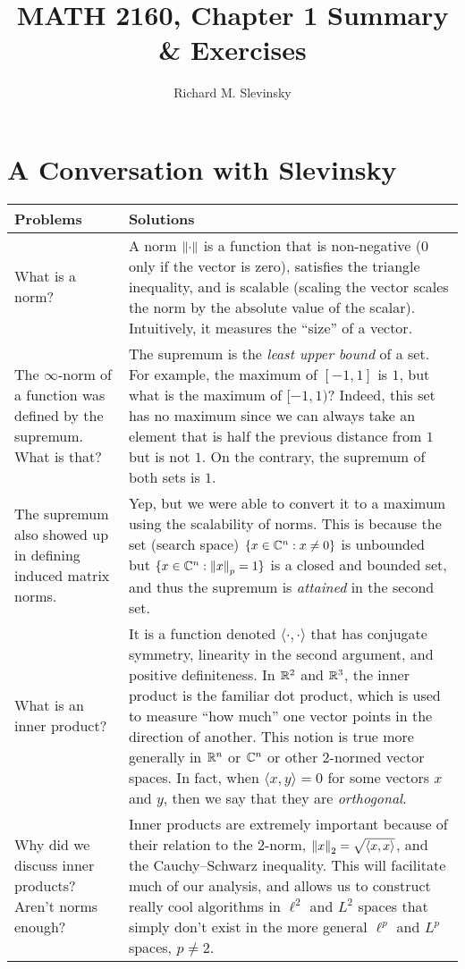 \documentclass[11pt,letterpaper]{article}
\begin{document}
\title{MATH 2160, Chapter 1 Summary \& Exercises}
\author{Richard M. Slevinsky}
\date{}
\maketitle

\section*{A Conversation with Slevinsky}

\begin{longtable}{p{}|p{}}
\hline
Problems & Solutions\\
\hline
What is a norm? & A norm $\left\|{\cdot}\right\|$ is a function that is non-negative ($0$ only if the vector is zero), satisfies the triangle inequality, and is scalable (scaling the vector scales the norm by the absolute value of the scalar). Intuitively, it measures the ``size'' of a vector.\\
The $\infty$-norm of a function was defined by the supremum. What is that? & The supremum is the {\em least upper bound} of a set. For example, the maximum of $[-1,1]$ is $1$, but what is the maximum of $[-1,1)$? Indeed, this set has no maximum since we can always take an element that is half the previous distance from $1$ but is not $1$. On the contrary, the supremum of both sets is $1$.\\
The supremum also showed up in defining induced matrix norms. & Yep, but we were able to convert it to a maximum using the scalability of norms. This is because the set (search space) $\{x\in\mathbb{C}^n : x \ne0\}$ is unbounded but $\{x\in\mathbb{C}^n : \left\|{x}\right\|_p = 1\}$ is a closed and bounded set, and thus the supremum is {\em attained} in the second set.\\
What is an inner product? & It is a function denoted $\langle\cdot,\cdot\rangle$ that has conjugate symmetry, linearity in the second argument, and positive definiteness. In $\mathbb{R}^2$ and $\mathbb{R}^3$, the inner product is the familiar dot product, which is used to measure ``how much'' one vector points in the direction of another. This notion is true more generally in $\mathbb{R}^n$ or $\mathbb{C}^n$ or other $2$-normed vector spaces. In fact, when $\langle x, y\rangle = 0$ for some vectors $x$ and $y$, then we say that they are {\em orthogonal}.\\
Why did we discuss inner products? Aren't norms enough? & Inner products are extremely important because of their relation to the $2$-norm, $\left\|{x}\right\|_2 = \sqrt{\langle x,x\rangle}$, and the Cauchy--Schwarz inequality. This will facilitate much of our analysis, and allows us to construct really cool algorithms in $\ell^2$ and $L^2$ spaces that simply don't exist in the more general $\ell^p$ and $L^p$ spaces, $p\ne2$.\\

\end{longtable}
\end{document}
